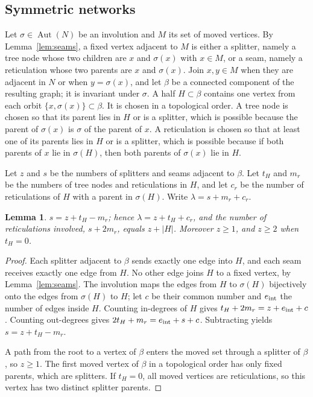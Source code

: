 \documentclass[11pt,a4paper]{article}
\newtheorem{lemma}[theorem]{Lemma}
\theoremstyle{definition}
\newcommand{\Aut}{\operatorname{Aut}}
\begin{document}
\subsection{Symmetric networks}

Let $\sigma\in\Aut(N)$ be an involution and $M$ its set of moved vertices. By Lemma~\ref{lem:seams}, a fixed vertex adjacent to $M$ is either a splitter, namely a tree node whose two children are $x$ and $\sigma(x)$ with $x\in M$, or a seam, namely a reticulation whose two parents are $x$ and $\sigma(x)$. Join $x,y\in M$ when they are adjacent in $N$ or when $y=\sigma(x)$, and let $\beta$ be a connected component of the resulting graph; it is invariant under $\sigma$. A half $H\subset\beta$ contains one vertex from each orbit $\{x,\sigma(x)\}\subset\beta$. It is chosen in a topological order. A tree node is chosen so that its parent lies in $H$ or is a splitter, which is possible because the parent of $\sigma(x)$ is $\sigma$ of the parent of $x$. A reticulation is chosen so that at least one of its parents lies in $H$ or is a splitter, which is possible because if both parents of $x$ lie in $\sigma(H)$, then both parents of $\sigma(x)$ lie in $H$.

Let $z$ and $s$ be the numbers of splitters and seams adjacent to $\beta$. Let $t_H$ and $m_r$ be the numbers of tree nodes and reticulations in $H$, and let $c_r$ be the number of reticulations of $H$ with a parent in $\sigma(H)$. Write $\lambda=s+m_r+c_r$.

\begin{lemma}\label{lem:blockid}
$s=z+t_H-m_r$; hence $\lambda=z+t_H+c_r$, and the number of reticulations involved, $s+2m_r$, equals $z+|H|$. Moreover $z\ge1$, and $z\ge2$ when $t_H=0$.
\end{lemma}

\begin{proof}
Each splitter adjacent to $\beta$ sends exactly one edge into $H$, and each seam receives exactly one edge from $H$. No other edge joins $H$ to a fixed vertex, by Lemma~\ref{lem:seams}. The involution maps the edges from $H$ to $\sigma(H)$ bijectively onto the edges from $\sigma(H)$ to $H$; let $c$ be their common number and $e_{\rm int}$ the number of edges inside $H$. Counting in-degrees of $H$ gives $t_H+2m_r=z+e_{\rm int}+c$. Counting out-degrees gives $2t_H+m_r=e_{\rm int}+s+c$. Subtracting yields $s=z+t_H-m_r$.

A path from the root to a vertex of $\beta$ enters the moved set through a splitter of $\beta$, so $z\ge1$. The first moved vertex of $\beta$ in a topological order has only fixed parents, which are splitters. If $t_H=0$, all moved vertices are reticulations, so this vertex has two distinct splitter parents.
\end{proof}
\end{document}
